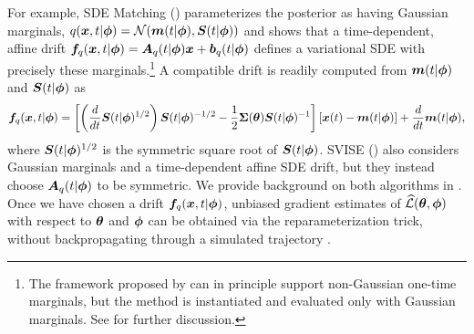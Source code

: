 For example, SDE Matching (\citet{bartosh2025sde}) parameterizes the posterior as having Gaussian marginals, $q(\boldsymbol{x},t|\boldsymbol{\phi})=\mathcal{N}(\boldsymbol{m}(t|\boldsymbol{\phi}),\boldsymbol{S}(t|\boldsymbol{\phi}))$ and shows that a time-dependent, affine drift $\boldsymbol{f}_q(\boldsymbol{x}, t | \boldsymbol{\phi}) = \boldsymbol{A}_q(t | \boldsymbol{\phi}) \boldsymbol{x} + \boldsymbol{b}_q(t | \boldsymbol{\phi})$ defines a variational SDE with precisely these marginals.\footnote{The framework proposed by \citet{bartosh2025sde} can in principle support non-Gaussian one-time marginals, but the method is instantiated and evaluated only with Gaussian marginals. See  for further discussion.}
A compatible drift is readily computed from $\boldsymbol{m}(t|\boldsymbol{\phi})$ and $\boldsymbol{S}(t|\boldsymbol{\phi})$ as
{\small
\begin{equation}\label{eqn:sym-sqrt-reference}
    \boldsymbol{f}_q(\boldsymbol{x},t|\boldsymbol{\phi}) = \left[\left(\frac{d}{dt}\boldsymbol{S}(t|\boldsymbol{\phi})^{1/2} \right) \boldsymbol{S}(t|\boldsymbol{\phi})^{-1/2} - \frac{1}{2}\boldsymbol{\Sigma}(\boldsymbol{\theta})\boldsymbol{S}(t|\boldsymbol{\phi})^{-1} \right][\boldsymbol{x}(t)-\boldsymbol{m}(t|\boldsymbol{\phi})] + \frac{d}{dt}\boldsymbol{m}(t|\boldsymbol{\phi}),
\end{equation} 
}
where $\boldsymbol{S}(t|\boldsymbol{\phi})^{1/2}$ is the symmetric square root of $\boldsymbol{S}(t|\boldsymbol{\phi})$.
SVISE (\citet{course2023state,course2023amortized}) also considers Gaussian marginals and a time-dependent affine SDE drift, but they instead choose $ \boldsymbol{A}_q(t | \boldsymbol{\phi})$ to be symmetric.
We provide background on both algorithms in .
Once we have chosen a drift $\boldsymbol{f}_q(\boldsymbol{x}, t | \boldsymbol{\phi})$, unbiased gradient estimates of $\widehat{\mathcal{L}}(\boldsymbol{\theta}, \boldsymbol{\phi})$ with respect to $\boldsymbol{\theta}$ and $\boldsymbol{\phi}$ can be obtained via the reparameterization trick, without backpropagating through a simulated trajectory \cite{kingma2013auto}.